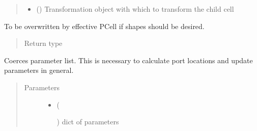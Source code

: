 \documentclass[a4paper,10pt,english]{sphinxmanual}
\begin{document}
\begin{fulllineitems}
\begin{fulllineitems}
\begin{quote}
\begin{description}
\begin{itemize}
\item {} 
 () \textendash{} Transformation object with which to transform the child cell

\end{itemize}

\end{description}\end{quote}

\end{fulllineitems}


\begin{fulllineitems}
\label{\detokenize{photonics:photonics.PhotDevice.shapes}}
To be overwritten by effective PCell if shapes should be desired.
\begin{quote}\begin{description}
\item[{Return type}] \leavevmode
{}%
\begin{footnote}[61]\sphinxAtStartFootnote
{}
%
\end{footnote}

\end{description}\end{quote}

\end{fulllineitems}


\begin{fulllineitems}
\label{\detokenize{photonics:photonics.PhotDevice.update_parameter_list}}
Coerces parameter list. This is necessary to calculate port locations and update parameters in general.
\begin{quote}\begin{description}
\item[{Parameters}] \leavevmode\begin{itemize}
\item {} 
 (%
\begin{footnote}[62]\sphinxAtStartFootnote
{}
%
\end{footnote}) \textendash{} dict of parameters


\end{itemize}
\end{description}
\end{quote}
\end{fulllineitems}
\end{fulllineitems}
\end{document}

